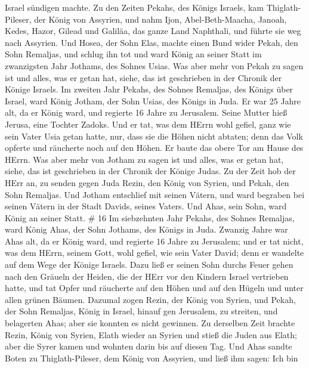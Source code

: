 Israel sündigen machte.  Zu den Zeiten Pekahs, des Königs
Israels, kam Thiglath-Pileser, der König von Assyrien, und nahm Ijon,
Abel-Beth-Maacha, Janoah, Kedes, Hazor, Gilead und Galiläa, das ganze
Land Naphthali, und führte sie weg nach Assyrien.  Und
Hosea, der Sohn Elas, machte einen Bund wider Pekah, den Sohn Remaljas,
und schlug ihn tot und ward König an seiner Statt im zwanzigsten Jahr
Jothams, des Sohnes Usias.  Was aber mehr von Pekah zu
sagen ist und alles, was er getan hat, siehe, das ist geschrieben in der
Chronik der Könige Israels.  Im zweiten Jahr Pekahs, des
Sohnes Remaljas, des Königs über Israel, ward König Jotham, der Sohn
Usias, des Königs in Juda.  Er war 25 Jahre alt, da er
König ward, und regierte 16 Jahre zu Jerusalem. Seine Mutter hieß
Jerusa, eine Tochter Zadoks.  Und er tat, was dem HErrn
wohl gefiel, ganz wie sein Vater Usia getan hatte,  nur,
dass sie die Höhen nicht abtaten; denn das Volk opferte und räucherte
noch auf den Höhen. Er baute das obere Tor am Hause des HErrn.
 Was aber mehr von Jotham zu sagen ist und alles, was er
getan hat, siehe, das ist geschrieben in der Chronik der Könige Judas.
 Zu der Zeit hob der HErr an, zu senden gegen Juda Rezin,
den König von Syrien, und Pekah, den Sohn Remaljas.  Und
Jotham entschlief mit seinen Vätern, und ward begraben bei seinen Vätern
in der Stadt Davids, seines Vaters.  Und Ahas, sein Sohn,
ward König an seiner Statt. \# 16  Im siebzehnten Jahr
Pekahs, des Sohnes Remaljas, ward König Ahas, der Sohn Jothams, des
Königs in Juda.  Zwanzig Jahre war Ahas alt, da er König
ward, und regierte 16 Jahre zu Jerusalem; und er tat nicht, was dem
HErrn, seinem Gott, wohl gefiel, wie sein Vater David;  denn
er wandelte auf dem Wege der Könige Israels. Dazu ließ er seinen Sohn
durchs Feuer gehen nach den Gräueln der Heiden, die der HErr vor den
Kindern Israel vertrieben hatte,  und tat Opfer und
räucherte auf den Höhen und auf den Hügeln und unter allen grünen
Bäumen.  Dazumal zogen Rezin, der König von Syrien, und
Pekah, der Sohn Remaljas, König in Israel, hinauf gen Jerusalem, zu
streiten, und belagerten Ahas; aber sie konnten es nicht gewinnen.
 Zu derselben Zeit brachte Rezin, König von Syrien, Elath
wieder an Syrien und stieß die Juden aus Elath; aber die Syrer kamen und
wohnten darin bis auf diesen Tag.  Und Ahas sandte Boten zu
Thiglath-Pileser, dem König von Assyrien, und ließ ihm sagen: Ich bin

